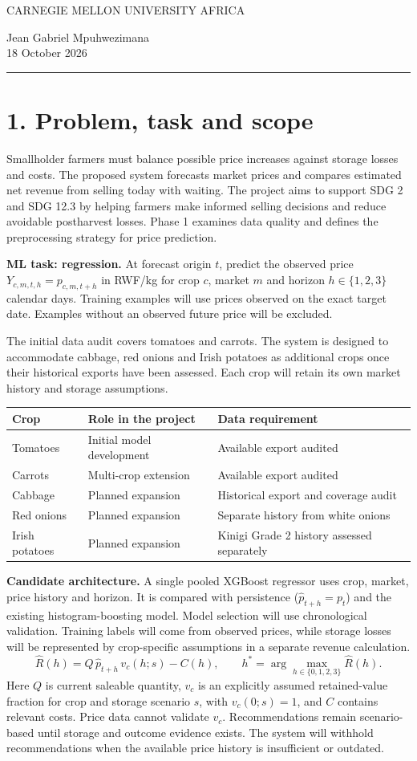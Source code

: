 \documentclass[11pt,a4paper]{article}
\newcommand{\titleblock}[2]{\begin{center}{\small CARNEGIE MELLON UNIVERSITY AFRICA}\par\vspace{8pt}{\LARGE\bfseries #1}\par\vspace{6pt}{\large #2}\par\vspace{8pt}Jean Gabriel Mpuhwezimana\\18 October 2026\end{center}\vspace{5pt}\hrule\vspace{8pt}}
\begin{document}
\titleblock{Preprocessing \& Feature Engineering}{Multi-Crop Sell-Timing Advisor for Rwanda}
\section*{1. Problem, task and scope}
Smallholder farmers must balance possible price increases against storage losses and costs. The proposed system forecasts market prices and compares estimated net revenue from selling today with waiting. The project aims to support SDG 2 and SDG 12.3 by helping farmers make informed selling decisions and reduce avoidable postharvest losses. Phase 1 examines data quality and defines the preprocessing strategy for price prediction.

\textbf{ML task: regression.} At forecast origin $t$, predict the observed price $Y_{c,m,t,h}=p_{c,m,t+h}$ in RWF/kg for crop $c$, market $m$ and horizon $h\in\{1,2,3\}$ calendar days. Training examples will use prices observed on the exact target date. Examples without an observed future price will be excluded.

The initial data audit covers tomatoes and carrots. The system is designed to accommodate cabbage, red onions and Irish potatoes as additional crops once their historical exports have been assessed. Each crop will retain its own market history and storage assumptions.

\begin{tabularx}{\textwidth}{@{}lLL@{}}\toprule
Crop & Role in the project & Data requirement\\\midrule
Tomatoes & Initial model development & Available export audited\\
Carrots & Multi-crop extension & Available export audited\\
Cabbage & Planned expansion & Historical export and coverage audit\\
Red onions & Planned expansion & Separate history from white onions\\
Irish potatoes & Planned expansion & Kinigi Grade 2 history assessed separately\\\bottomrule
\end{tabularx}

\textbf{Candidate architecture.} A single pooled XGBoost regressor uses crop, market, price history and horizon. It is compared with persistence ($\hat p_{t+h}=p_t$) and the existing histogram-boosting model. Model selection will use chronological validation. Training labels will come from observed prices, while storage losses will be represented by crop-specific assumptions in a separate revenue calculation.
\[
\widehat R(h)=Q\,\widehat p_{t+h}\,v_c(h;s)-C(h),\qquad
h^*=\arg\max_{h\in\{0,1,2,3\}}\widehat R(h).
\]
Here $Q$ is current saleable quantity, $v_c$ is an explicitly assumed retained-value fraction for crop and storage scenario $s$, with $v_c(0;s)=1$, and $C$ contains relevant costs. Price data cannot validate $v_c$. Recommendations remain scenario-based until storage and outcome evidence exists. The system will withhold recommendations when the available price history is insufficient or outdated.
\newpage
\end{document}

